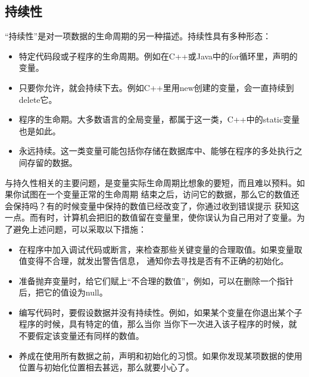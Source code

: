 \documentclass{article}
\begin{document}
\subsection{持续性}
“持续性”是对一项数据的生命周期的另一种描述。持续性具有多种形态：
\begin{itemize}
    \item 特定代码段或子程序的生命周期。例如在C++或Java中的for循环里，声明的变量。
    \item 只要你允许，就会持续下去。例如C++里用new创建的变量，会一直持续到delete它。
    \item 程序的生命期。大多数语言的全局变量，都属于这一类，C++中的static变量也是如此。
    \item 永远持续。这一类变量可能包括你存储在数据库中、能够在程序的多处执行之间存留的数据。
\end{itemize}
与持久性相关的主要问题，是变量实际生命周期比想象的要短，而且难以预料。如果你试图在一个变量正常的生命周期
结束之后，访问它的数据，那么它的数值还会保持吗？有的时候变量中保持的数值已经改变了，你通过收到错误提示
获知这一点。而有时，计算机会把旧的数值留在变量里，使你误认为自己用对了变量。为了避免上述问题，可以采取以下措施：
\begin{itemize}
    \item 在程序中加入调试代码或断言，来检查那些关键变量的合理取值。如果变量取值变得不合理，就发出警告信息，
    通知你去寻找是否有不正确的初始化。
    \item 准备抛弃变量时，给它们赋上“不合理的数值”，例如，可以在删除一个指针后，把它的值设为null。
    \item 编写代码时，要假设数据并没有持续性。例如，如果某个变量在你退出某个子程序的时候，具有特定的值，那么当你
    当你下一次进入该子程序的时候，就不要假定该变量还有同样的数值。
    \item 养成在使用所有数据之前，声明和初始化的习惯。如果你发现某项数据的使用位置与初始化位置相去甚远，那么就要小心了。
\end{itemize}
\end{document}
